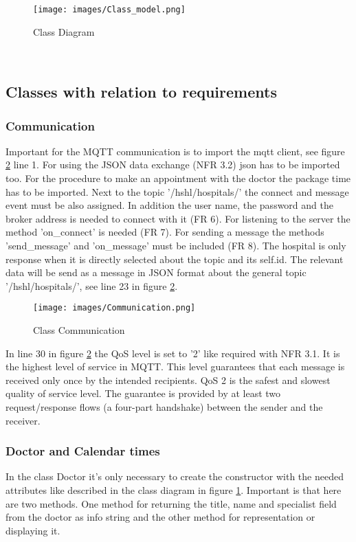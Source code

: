 \begin{figure}[H]
\centering
\sidecaption
\texttt{[image: images/Class\_model.png]}
\caption{Class Diagram}
\label{Class_diagram}
\end{figure}

\\
\subsection{Classes with relation to requirements}
\subsubsection{Communication}
Important for the MQTT communication is to import the mqtt client, see figure \ref{Communication} line 1. For using the JSON data exchange (NFR 3.2) json has to be imported too. For the procedure to make an appointment with the doctor the package time has to be imported. Next to the topic '/hshl/hospitals/' the connect and message event must be also assigned. In addition the user name, the password and the broker address is needed to connect with it (FR 6). For listening to the server the method 'on_connect' is needed (FR 7). For sending a message the methods 'send_message' and 'on_message' must be included (FR 8). The hospital is only response when it is directly selected about the topic and its self.id. The relevant data will be send as a message in JSON format about the general topic '/hshl/hospitals/', see line 23 in figure \ref{Communication}.

\begin{figure}[H]
\centering
\sidecaption
\texttt{[image: images/Communication.png]}
\caption{Class Communication}
\label{Communication}
\end{figure}

In line 30 in figure \ref{Communication} the QoS level is set to '2' like required with NFR 3.1. It is the highest level of service in MQTT. This level guarantees that each message is received only once by the intended recipients. QoS 2 is the safest and slowest quality of service level. The guarantee is provided by at least two request/response flows (a four-part handshake) between the sender and the receiver.

\subsubsection{Doctor and Calendar times}
In the class Doctor it's only necessary to create the constructor with the needed attributes like described in the class diagram in figure \ref{Class_diagram}. Important is that here are two methods. One method for returning the title, name and specialist field from the doctor as info string and the other method for representation or displaying it. 

